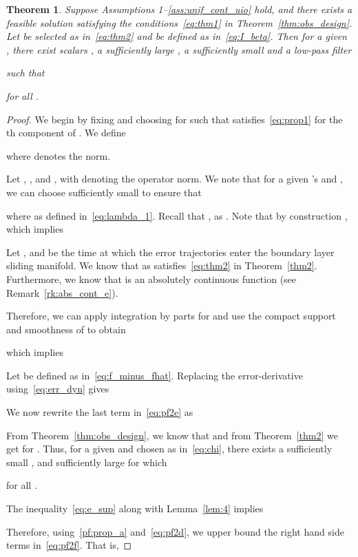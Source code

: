 \documentclass[times, doublespace]{rncauth}
\newtheorem{theorem}{Theorem}
\begin{document}
\begin{theorem}\label{thm:act_fault_unstable}
	Suppose Assumptions 1--\ref{ass:unif_cont_uio} hold, and there exists a feasible solution  satisfying the conditions~\eqref{eq:thm1} in Theorem~\ref{thm:obs_design}. Let  be selected as in~\eqref{eq:thm2} and  be defined as in~\eqref{eq:I_beta}. 
	Then for a given , there exist scalars , a sufficiently large , a sufficiently small  and a low-pass filter 
	
	such that
	
	for all .
\end{theorem}
\begin{proof}
	We begin by fixing  and choosing  for  such that  satisfies~\eqref{eq:prop1} for the th component of . We define
	
	where  denotes the  norm.
	
	Let , , and , with  denoting the operator norm. We note that for a given 's and , we can choose  sufficiently small to ensure that
	
	where 
	as defined in~\eqref{eq:lambda_1}. Recall that , as . Note that by construction , which implies
	
	Let , and  be the time at which the error trajectories enter the boundary layer sliding manifold. We know that  as  satisfies~\eqref{eq:thm2} in Theorem~\ref{thm2}. Furthermore, we know that  is an absolutely continuous function (see Remark~\ref{rk:abs_cont_e}). 
	
	Therefore, we can apply integration by parts for  and use the compact support and smoothness of  to obtain
	
	which implies
	
	Let  be defined as in~\eqref{eq:f_minus_fhat}. Replacing the error-derivative  using~\eqref{eq:err_dyn} gives
	
	
	We now rewrite the last term in~\eqref{eq:pf2e} as
	
From Theorem~\ref{thm:obs_design}, we know that 
	 and from Theorem~\ref{thm2} we get  for . Thus, for a given  and  chosen as in~\eqref{eq:chi}, there exists a sufficiently small , and sufficiently large  for which
	
	for all . 
	
	The inequality~\eqref{eq:e_sup} along with Lemma~\ref{lem:4} implies
	
	
	Therefore, using~\eqref{pf:prop_a} and~\eqref{eq:pf2d}, we upper bound the right hand side terms in~\eqref{eq:pf2f}. That is,
	

\end{proof}
\end{document}
